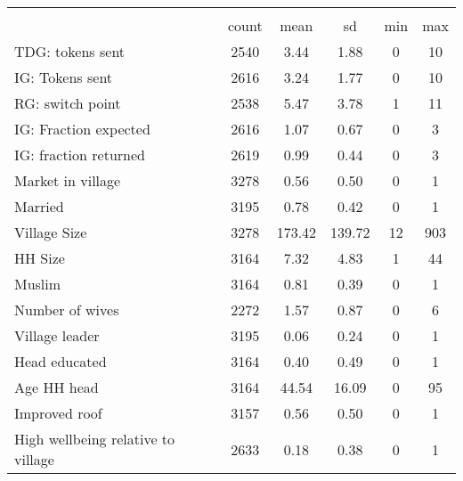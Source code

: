{
\def\sym#1{\ifmmode^{#1}\else\(^{#1}\)\fi}
\begin{tabular}{l*{1}{ccccc}}
\hline\hline
                    &\multicolumn{5}{c}{}                                            \\
                    &       count&        mean&          sd&         min&         max\\
\hline
TDG: tokens sent    &        2540&        3.44&        1.88&           0&          10\\
IG: Tokens sent     &        2616&        3.24&        1.77&           0&          10\\
RG: switch point    &        2538&        5.47&        3.78&           1&          11\\
IG: Fraction expected&        2616&        1.07&        0.67&           0&           3\\
IG: fraction returned&        2619&        0.99&        0.44&           0&           3\\
Market in village   &        3278&        0.56&        0.50&           0&           1\\
Married             &        3195&        0.78&        0.42&           0&           1\\
Village Size        &        3278&      173.42&      139.72&          12&         903\\
HH Size             &        3164&        7.32&        4.83&           1&          44\\
Muslim              &        3164&        0.81&        0.39&           0&           1\\
Number of wives     &        2272&        1.57&        0.87&           0&           6\\
Village leader      &        3195&        0.06&        0.24&           0&           1\\
Head educated       &        3164&        0.40&        0.49&           0&           1\\
Age HH head         &        3164&       44.54&       16.09&           0&          95\\
Improved roof       &        3157&        0.56&        0.50&           0&           1\\
High wellbeing relative to village&        2633&        0.18&        0.38&           0&           1\\
\hline\hline
\end{tabular}
}

